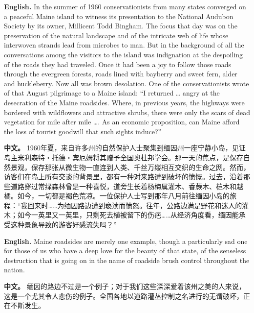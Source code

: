\noindent\textbf{English.} In the summer of 1960 conservationists from many states converged on a peaceful Maine island to witness its presentation to the National Audubon Society by its owner, Millicent Todd Bingham. The focus that day was on the preservation of the natural landscape and of the intricate web of life whose interwoven strands lead from microbes to man. But in the background of all the conversations among the visitors to the island was indignation at the despoiling of the roads they had traveled. Once it had been a joy to follow those roads through the evergreen forests, roads lined with bayberry and sweet fern, alder and huckleberry. Now all was brown desolation. One of the conservationists wrote of that August pilgrimage to a Maine island: ``I returned \ldots{} angry at the desecration of the Maine roadsides. Where, in previous years, the highways were bordered with wildflowers and attractive shrubs, there were only the scars of dead vegetation for mile after mile \ldots{}. As an economic proposition, can Maine afford the loss of tourist goodwill that such sights induce?''
\par
\noindent\textbf{中文。} 1960年夏，来自许多州的自然保护人士聚集到缅因州一座宁静小岛，见证岛主米利森特・托德・宾厄姆将其赠予全国奥杜邦学会。那一天的焦点，是保存自然景观，保存那张从微生物一直连到人类、千丝万缕相互交织的生命之网。然而，访客们在岛上所有交谈的背景里，都有一种对来路遭到破坏的愤慨。过去，沿着那些道路穿过常绿森林曾是一种喜悦，道旁生长着杨梅属灌木、香蕨木、桤木和越橘。如今，一切都是褐色荒凉。一位保护人士写到那年八月前往缅因小岛的旅程：“我回来时……为缅因路边遭到亵渎而愤怒。往年，公路边满是野花和迷人的灌木；如今一英里又一英里，只剩死去植被留下的伤疤……从经济角度看，缅因能承受这种景象导致的游客好感流失吗？”
\par\medskip

\noindent\textbf{English.} Maine roadsides are merely one example, though a particularly sad one for those of us who have a deep love for the beauty of that state, of the senseless destruction that is going on in the name of roadside brush control throughout the nation.
\par
\noindent\textbf{中文。} 缅因的路边不过是一个例子；对于我们这些深深爱着该州之美的人来说，这是一个尤其令人悲伤的例子。全国各地以道路灌丛控制之名进行的无谓破坏，正在不断发生。
\par\medskip

